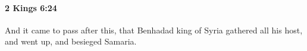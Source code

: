 
		\paragraph{2 Kings 6:24} %
			\label{2KINGS-6-24}

			And it came to pass after this, that Benhadad king of Syria gathered all his host, and went up, and besieged Samaria.


